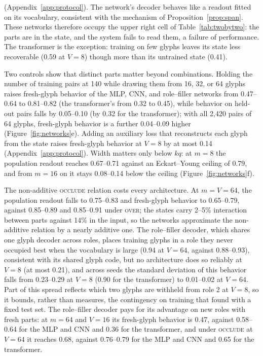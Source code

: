 \documentclass[10pt]{article}
\theoremstyle{plain}
\theoremstyle{remark}
\begin{document}
(Appendix~\ref{app:protocol}). The network's decoder behaves like a readout fitted on its vocabulary, consistent with the mechanism of Proposition~\ref{prop:span}. These networks therefore occupy the upper right cell of Table~\ref{tab:twobytwo}: the parts are in the state, and the system fails to read them, a failure of performance. The transformer is the exception: training on few glyphs leaves its state less recoverable (0.59 at $V = 8$) though more than its untrained state (0.41).

Two controls show that distinct parts matter beyond combinations. Holding the number of training pairs at 140 while drawing them from 16, 32, or 64 glyphs raises fresh-glyph behavior of the MLP, CNN, and role--filler networks from 0.47--0.64 to 0.81--0.82 (the transformer's from 0.32 to 0.45), while behavior on held-out pairs falls by 0.05--0.10 (by 0.32 for the transformer); with all 2{,}420 pairs of 64 glyphs, fresh-glyph behavior is a further 0.04--0.09 higher (Figure~\ref{fig:networks}e). Adding an auxiliary loss that reconstructs each glyph from the state raises fresh-glyph behavior at $V = 8$ by at most 0.14 (Appendix~\ref{app:protocol}). Width matters only below $kq$: at $m = 8$ the population readout reaches 0.67--0.71 against an Eckart--Young ceiling of 0.79, and from $m = 16$ on it stays 0.08--0.14 below the ceiling (Figure~\ref{fig:networks}f).

The non-additive \textsc{occlude} relation costs every architecture. At $m = V = 64$, the population readout falls to 0.75--0.83 and fresh-glyph behavior to 0.65--0.79, against 0.85--0.89 and 0.85--0.91 under \textsc{over}; the states carry 2--5\% interaction between parts against 14\% in the input, so the networks approximate the non-additive relation by a nearly additive one. The role--filler decoder, which shares one glyph decoder across roles, places training glyphs in a role they never occupied best when the vocabulary is large (0.94 at $V = 64$, against 0.88--0.93), consistent with its shared glyph code, but no architecture does so reliably at $V = 8$ (at most 0.21), and across seeds the standard deviation of this behavior falls from 0.23--0.29 at $V = 8$ (0.90 for the transformer) to 0.01--0.02 at $V = 64$. Part of this spread reflects which two glyphs are withheld from role 2 at $V = 8$, so it bounds, rather than measures, the contingency on training that \citet{mccoy2020berts} found with a fixed test set. The role--filler decoder pays for its advantage on new roles with fresh parts: at $m = 64$ and $V = 16$ its fresh-glyph behavior is 0.47, against 0.58--0.64 for the MLP and CNN and 0.36 for the transformer, and under \textsc{occlude} at $V = 64$ it reaches 0.68, against 0.76--0.79 for the MLP and CNN and 0.65 for the transformer.
\end{document}
